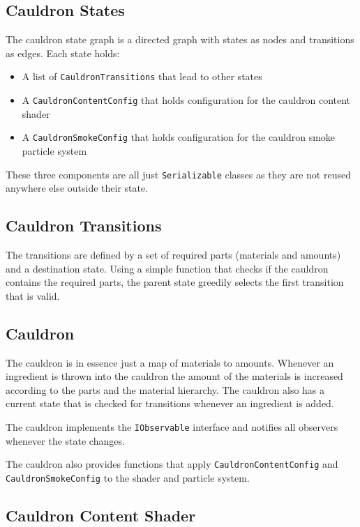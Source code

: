 \documentclass{vgtc}
\begin{document}
\subsection{Cauldron States}

The cauldron state graph is a directed graph with states as nodes and transitions as edges. Each state holds:

\begin{itemize}
  \item A list of \texttt{CauldronTransitions} that lead to other states
  \item A \texttt{CauldronContentConfig} that holds configuration for the cauldron content shader
  \item A \texttt{CauldronSmokeConfig} that holds configuration for the cauldron smoke particle system
\end{itemize}

These three components are all just \texttt{Serializable} classes as they are not reused anywhere else outside
their state.

\subsection{Cauldron Transitions}

The transitions are defined by a set of required parts (materials and amounts) and a destination state. Using a
simple function that checks if the cauldron contains the required parts, the parent state greedily selects the
first transition that is valid.

\subsection{Cauldron}

The cauldron is in essence just a map of materials to amounts. Whenever an ingredient is thrown into the cauldron
the amount of the materials is increased according to the parts and the material hierarchy. The cauldron also has
a current state that is checked for transitions whenever an ingredient is added.

The cauldron implements the \texttt{IObservable} interface and notifies all observers whenever the state changes.

The cauldron also provides functions that apply \texttt{CauldronContentConfig} and \texttt{CauldronSmokeConfig} to
the shader and particle system.

\subsection{Cauldron Content Shader}
\end{document}
